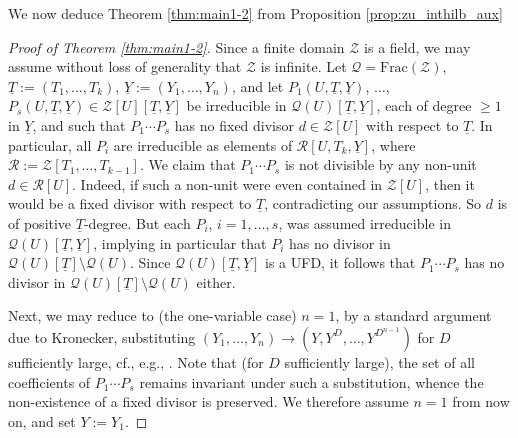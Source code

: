 \documentclass[11pt,a4paper,reqno]{amsart}
\theoremstyle{definition}
\begin{document}
We now deduce Theorem \ref{thm:main1-2} from Proposition \ref{prop:zu_inthilb_aux}
\begin{proof}[Proof of Theorem \ref{thm:main1-2}]
Since a finite domain $\mathcal Z$ is a field, we may assume without loss of generality that $\mathcal Z$ is infinite.
Let $\mathcal Q=\textrm{Frac}(\mathcal Z)$, $\underline{T}:=(T_1,\dots, T_k)$, $\underline{Y}:=(Y_1,\dots, Y_n)$, and let $P_1(U,\underline{T}, \underline{Y})$, $\dots$, $P_s(U,\underline{T}, \underline{Y})\in \mathcal Z[U][\underline{T},\underline{Y}]$ be irreducible in $\mathcal Q(U)[\underline{T},\underline{Y}]$, each of degree $\ge 1$ in $\underline{Y}$, 
%
and such that $P_1\cdots P_s$ has no fixed divisor $d\in \mathcal Z[U]$ with respect to $\underline{T}$. In particular, all $P_i$ are irreducible as elements of $\mathcal R[U,T_k,\underline{Y}]$, where $\mathcal R:=\mathcal Z[T_1,\dots, T_{k-1}]$. 
%
We claim that $P_1\cdots P_s$ is not divisible by any non-unit $d\in \mathcal R[U]$. %
Indeed, if such a non-unit were even contained in $\mathcal Z[U]$, then it would be a fixed divisor with respect to $\underline{T}$, contradicting our assumptions. So $d$ is of positive $\underline{T}$-degree. But each $P_i$, $i=1,\dots, s$, was assumed irreducible in $\mathcal Q(U)[\underline{T},\underline{Y}]$, implying in particular that $P_i$ has no divisor in $\mathcal{Q}(U)[\underline{T}]\setminus \mathcal{Q}(U)$. Since $\mathcal Q(U)[\underline{T},\underline{Y}]$ is a UFD, it follows that $P_1\cdots P_s$ has no divisor in  $\mathcal Q(U)[\underline{T}]\setminus \mathcal{Q}(U)$ either.

Next, we may reduce to (the one-variable case) $n=1$, by a standard argument due to Kronecker, substituting $(Y_1,\dots, Y_n)\to (Y, Y^D,\dots, Y^{D^{n-1}})$ for $D$ sufficiently large, cf., e.g., \cite[Proposition 4.3]{BDN20b}. Note that (for $D$ sufficiently large), the set of all coefficients of $P_1\cdots P_s$ remains invariant under such a substitution, whence the non-existence of a fixed divisor is preserved. We therefore assume $n=1$ from now on, and set $Y:=Y_1$.


\end{proof}
\end{document}
